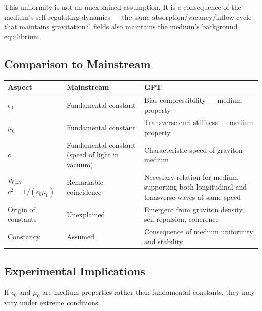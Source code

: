 \documentclass[12pt, a4paper]{article}
\begin{document}
This uniformity is not an unexplained assumption. It is a consequence of the medium's self-regulating dynamics — the same absorption/vacancy/inflow cycle that maintains gravitational fields also maintains the medium's background equilibrium.

\subsection{Comparison to Mainstream}
\label{subsec:constants_comparison}

\begin{center}
\begin{tabular}{|p{3.5cm}|p{5cm}|p{5cm}|}
\hline
\textbf{Aspect} & \textbf{Mainstream} & \textbf{GPT} \\
\hline
\( \epsilon_0 \) & Fundamental constant & Bias compressibility — medium property \\
\hline
\( \mu_0 \) & Fundamental constant & Transverse curl stiffness — medium property \\
\hline
\( c \) & Fundamental constant (speed of light in vacuum) & Characteristic speed of graviton medium \\
\hline
Why \( c^2 = 1/(\epsilon_0 \mu_0) \) & Remarkable coincidence & Necessary relation for medium supporting both longitudinal and transverse waves at same speed \\
\hline
Origin of constants & Unexplained & Emergent from graviton density, self-repulsion, coherence \\
\hline
Constancy & Assumed & Consequence of medium uniformity and stability \\
\hline
\end{tabular}
\end{center}

\subsection{Experimental Implications}
\label{subsec:constants_experimental}

If \( \epsilon_0 \) and \( \mu_0 \) are medium properties rather than fundamental constants, they may vary under extreme conditions:
\end{document}
